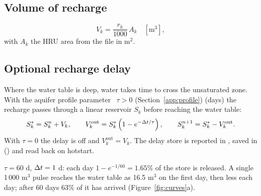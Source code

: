 \subsection{Volume of recharge}
\begin{equation}
V_k=\frac{r_k}{1000}\,A_k \quad[\mathrm{m}^3],
\end{equation}
with $A_k$ the HRU area from the  file in m$^2$.

\subsection{Optional recharge delay}
Where the water table is deep, water takes time to cross the unsaturated zone. With the aquifer profile parameter ~$\tau>0$ (Section~\ref{app:profile})
(days) the recharge passes through a linear reservoir $S_k$ before reaching the water table:
\begin{equation}
S_k^{*}=S_k^{n}+V_k,\qquad V_k^{\mathrm{out}}=S_k^{*}\left(1-e^{-\Delta t/\tau}\right),\qquad S_k^{n+1}=S_k^{*}-V_k^{\mathrm{out}} .
\end{equation}
With $\tau=0$ the delay is off and $V_k^{\mathrm{out}}=V_k$. The delay store is reported in , saved in
 () and read back on hotstart.
\begin{example}
$\tau=60$ d, $\Delta t=1$ d: each day $1-e^{-1/60}=1.65\%$ of the store is released. A single 1\,000 m$^3$ pulse reaches the
water table as 16.5 m$^3$ on the first day, then less each day; after 60 days 63\% of it has arrived
(Figure~\ref{fig:curves}a).
\end{example}

